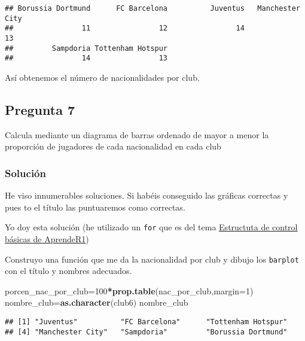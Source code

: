 \documentclass[
]{article}
\newenvironment{Shaded}{\begin{snugshade}}{\end{snugshade}}
\newcommand{\DataTypeTok}[1]{\textcolor[rgb]{0.13,0.29,0.53}{#1}}
\newcommand{\DecValTok}[1]{\textcolor[rgb]{0.00,0.00,0.81}{#1}}
\newcommand{\KeywordTok}[1]{\textcolor[rgb]{0.13,0.29,0.53}{\textbf{#1}}}
\newcommand{\NormalTok}[1]{#1}
\newcommand{\OperatorTok}[1]{\textcolor[rgb]{0.81,0.36,0.00}{\textbf{#1}}}
\begin{document}
\begin{verbatim}
## Borussia Dortmund      FC Barcelona          Juventus   Manchester City 
##                11                12                14                13 
##         Sampdoria Tottenham Hotspur 
##                14                13
\end{verbatim}

Así obtenemos el número de nacionalidades por club.

\hypertarget{pregunta-7}{%
\subsection{Pregunta 7}\label{pregunta-7}}

Calcula mediante un diagrama de barras ordenado de mayor a menor la
proporción de jugadores de cada nacionalidad en cada club

\hypertarget{soluciuxf3n-7}{%
\subsubsection{Solución}\label{soluciuxf3n-7}}

He viso innumerables soluciones. Si habéis conseguido las gráficas
correctas y pues to el título las puntuaremos como correctas.

Yo doy esta solución (he utilizado un \texttt{for} que es del tema
\href{https://aprender-uib.github.io/AprendeR1/chap-for.html}{Estructuta
de control básicas de AprendeR1})

Construyo una función que me da la nacionalidad por club y dibujo los
\texttt{barplot} con el título y nombres adecuados.

\begin{Shaded}
\begin{Highlighting}[]
\NormalTok{porcen_nac_por_club=}\DecValTok{100}\OperatorTok{*}\KeywordTok{prop.table}\NormalTok{(nac_por_club,}\DataTypeTok{margin=}\DecValTok{1}\NormalTok{)}
\NormalTok{nombre_club=}\KeywordTok{as.character}\NormalTok{(club6)}
\NormalTok{nombre_club}
\end{Highlighting}
\end{Shaded}

\begin{verbatim}
## [1] "Juventus"          "FC Barcelona"      "Tottenham Hotspur"
## [4] "Manchester City"   "Sampdoria"         "Borussia Dortmund"
\end{verbatim}
\end{document}
